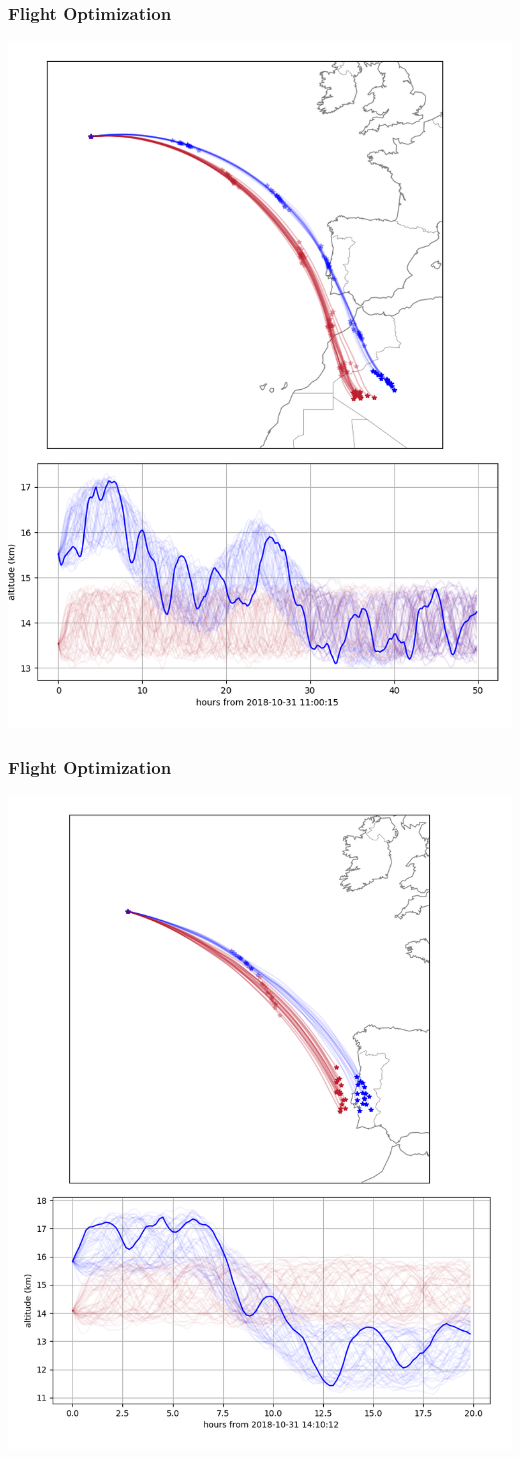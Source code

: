 \documentclass[10pt,mathserif]{beamer}
\begin{document}
\begin{frame}
\frametitle{Flight Optimization}
\begin{center}
\includegraphics[width=.6\linewidth,trim={0 0cm 0 0cm},clip]{f6.png}
\end{center}
\end{frame}
\begin{frame}
\frametitle{Flight Optimization}
\begin{center}
\includegraphics[width=.6\linewidth,trim={0 0cm 0 0cm},clip]{f7.png}
\end{center}
\end{frame}
\end{document}
